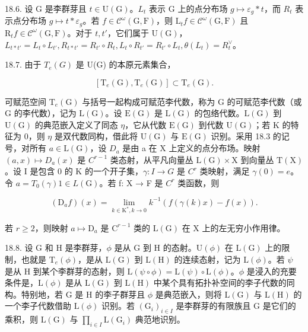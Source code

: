 18.6. 设 G 是李群芽且 \(t \in \mathrm{U}(\mathrm{G})\)。\(L_{t}\) 表示 G 上的点分布场 \(g \mapsto \varepsilon_{g} * t\)，而 \(R_{t}\) 表示点分布场 \(g \mapsto t * \varepsilon_{g}\)。若 \(f \in \mathcal{C}^{\omega}(\mathrm{G}, \mathrm{F})\)，则 \(\mathrm{L}_{t} f \in \mathcal{C}^{\omega}(\mathrm{G}, \mathrm{F})\) 且 \(\mathrm{R}_{t} f \in \mathcal{C}^{\omega}(\mathrm{G}, \mathrm{F})\)。对于 \(t, t'\)，它们属于 \(\mathrm{U}(\mathrm{G})\)，\(L_{t* t'} = L_t \circ L_{t'}, R_{t* t'} = R_{t'} \circ R_t, L_t \circ R_{t'} = R_{t'} \circ L_t, \theta(L_t) = R_t^\vee\)。

18.7. 由于 \(T_{e}(G)\) 是 U(G) 的本原元素集合，

\[
[ \mathrm{T} _ {e} (\mathrm{G}), \mathrm{T} _ {e} (\mathrm{G}) ] \subset \mathrm{T} _ {e} (\mathrm{G}).
\]

可赋范空间 \(\mathrm{T}_{e}(\mathrm{G})\) 与括号一起构成可赋范李代数，称为 G 的可赋范李代数（或 G 的李代数），记为 \(\mathrm{L}(\mathrm{G})\)。设 \(\mathrm{E}(\mathrm{G})\) 是 \(\mathrm{L}(\mathrm{G})\) 的包络代数。\(\mathrm{L}(\mathrm{G})\) 到 \(\mathrm{U}(\mathrm{G})\) 的典范嵌入定义了同态 \(\eta\)，它从代数 \(\mathrm{E}(\mathrm{G})\) 到代数 \(\mathrm{U}(\mathrm{G})\)；若 K 的特征为 0，则 \(\eta\) 是双代数同构，借此将 \(\mathrm{U}(\mathrm{G})\) 与 \(\mathrm{E}(\mathrm{G})\) 识别。采用 18.3 的记号，对所有 \(a \in \mathrm{L}(\mathrm{G})\)，设 \(D_{a}\) 是由 a 在 X 上定义的点分布场。映射 \((a, x) \mapsto D_{a}(x)\) 是 \(C^{r-1}\) 类态射，从平凡向量丛 \(\mathrm{L}(\mathrm{G}) \times \mathrm{X}\) 到向量丛 \(\mathrm{T}(\mathrm{X})\)。设 I 是包含 0 的 K 的一个开子集，\(\gamma: I \to G\) 是 \(C^{r}\) 类映射，满足 \(\gamma(0) = e\)。令 \(a = T_{0}(\gamma) 1 \in L(\mathrm{G})\)。若 f: X → F 是 \(C^{r}\) 类函数，则

\[
\left(\mathrm{D} _ {a} f\right) (x) = \lim _ {k \in \mathrm{K} ^ {*}, k \rightarrow 0} k ^ {- 1} \left(f (\gamma (k) x) - f (x)\right).
\]

若 \(r \geqslant 2\)，则映射 \(a \mapsto \mathrm{D}_a\) 是 \(\mathrm{C}^{r-1}\) 类的 \(\mathrm{L}(\mathrm{G})\) 在 \(\mathrm{X}\) 上的左无穷小作用律。

18.8. 设 G 和 H 是李群芽，\(\phi\) 是从 G 到 H 的态射。\(\mathrm{U}(\phi)\) 在 \(\mathrm{L}(\mathrm{G})\) 上的限制，也就是 \(\mathrm{T}_{e}(\phi)\)，是从 \(\mathrm{L}(\mathrm{G})\) 到 \(\mathrm{L}(\mathrm{H})\) 的连续态射，记为 \(\mathrm{L}(\phi)\)。若 \(\psi\) 是从 H 到某个李群芽的态射，则 \(\mathrm{L}(\psi \circ \phi) = \mathrm{L}(\psi) \circ \mathrm{L}(\phi)\)。\(\phi\) 是浸入的充要条件是，\(\mathrm{L}(\phi)\) 是从 \(\mathrm{L}(\mathrm{G})\) 到 \(\mathrm{L}(\mathrm{H})\) 中某个具有拓扑补空间的李子代数的同构。特别地，若 G 是 H 的李子群芽且 \(\phi\) 是典范嵌入，则将 \(\mathrm{L}(\mathrm{G})\) 与 \(\mathrm{L}(\mathrm{H})\) 的一个李子代数借助 \(\mathrm{L}(\phi)\) 识别。若 \((\mathrm{G}_{i})_{i\in I}\) 是李群芽的有限族且 G 是它们的乘积，则 \(\mathrm{L}(\mathrm{G})\) 与 \(\prod_{i\in I}\mathrm{L}(\mathrm{G}_{i})\) 典范地识别。

